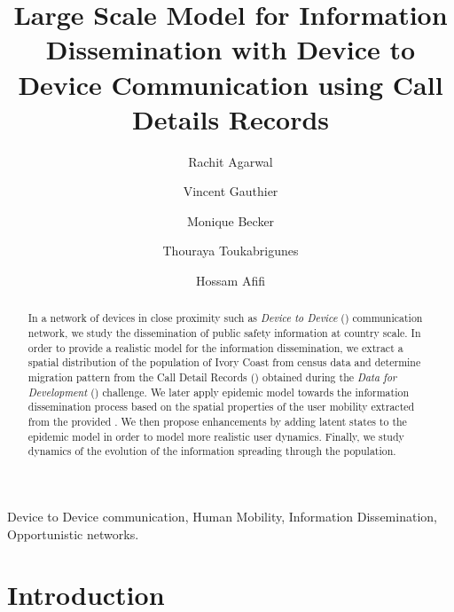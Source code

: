 \documentclass[review]{elsarticle}
\begin{document}
\begin{frontmatter}

\title{Large Scale Model for Information Dissemination with Device to Device Communication using Call Details Records}




\author[mainaddress]{Rachit Agarwal}
\author[mainaddress]{Vincent Gauthier }
\author[mainaddress]{Monique Becker}
\author[mainaddress,secondaryaddress]{Thouraya Toukabrigunes}
\author[mainaddress]{Hossam Afifi}
\address[mainaddress]{Lab. CNRS SAMOVAR UMR 5157, Telecom SudParis/Institut Mines-Telecom.}
\address[secondaryaddress]{Orange Lab.}

\begin{abstract}
In a network of devices in close proximity such as \emph{Device to Device} () communication network, we study the dissemination of public safety information at country scale. In order to provide a realistic model for the information dissemination, we extract a spatial distribution of the population of Ivory Coast from census data and determine migration pattern from the Call Detail Records () obtained during the \emph{Data for Development} () challenge. We later apply epidemic model towards the information dissemination process based on the spatial properties of the user mobility extracted from the provided . We then propose enhancements by adding latent states to the epidemic model in order to model more realistic user dynamics. Finally, we study dynamics of the evolution of the information spreading through the population.
\end{abstract}

\begin{keyword}
Device to Device communication, Human Mobility, Information Dissemination, Opportunistic networks.
\end{keyword}

\end{frontmatter}
\section{Introduction}\label{sec:introduction}
\end{document}
